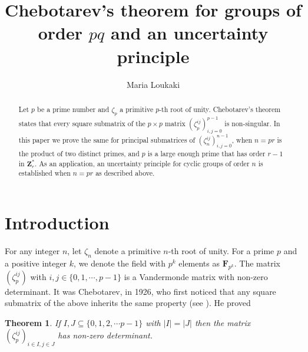 \documentclass[a4paper,12pt,reqno]{amsart}
\newtheorem{theorem}{Theorem}
\def\F{\mathbf{F}}
\begin{document}
\title{ Chebotarev's theorem  for groups of order $pq$  and an uncertainty principle}

\author{Maria Loukaki}
\address{Department of Mathematics \& Applied Mathematics, University of Crete, Greece}


\begin{abstract}
Let $p$ be a prime number and $\zeta_p$ a primitive $p$-th root of unity. Chebotarev's theorem states that every square submatrix of the $p \times p$ matrix $(\zeta_p^{ij})_{i,j=0}^{p-1}$ is non-singular. In this  paper we  prove the same for principal  submatrices of $(\zeta_n^{ij})_{i,j=0}^{n-1}$, when  $n=pr$ is the product of two distinct primes, and $p$ is a large enough prime that has order $r-1$ in $\mathbf{Z}_r^*$. As an application,  an uncertainty principle for cyclic groups of order $n$ is established when $n=pr$ as described above.
\end{abstract}

\maketitle
\section{Introduction}
For any integer $ n$, let $ \zeta_n$  denote a primitive $n$-th root of unity. For a prime $p$  and a positive integer $k$, we denote the field with $ p^k $ elements as $\F_{p^k}$.  The matrix $(\zeta_p^{ij})$ with $i,j \in \{ 0, 1, \cdots, p-1\}$ is a Vandermonde matrix with non-zero determinant. It was Chebotarev, in 1926, who first noticed that any square submatrix of the above inherits the same property (see \cite{Lenstra}). He proved 
\begin{theorem}\label{Thm:Chebotarev}
If $I, J \subseteq \{ 0, 1, 2, \cdots p-1 \}$  with $|I|=|J|$ then the matrix 
$(\zeta_p^{ij})_{i\in I, j \in J}$ has non-zero determinant.
\end{theorem}
\end{document}
